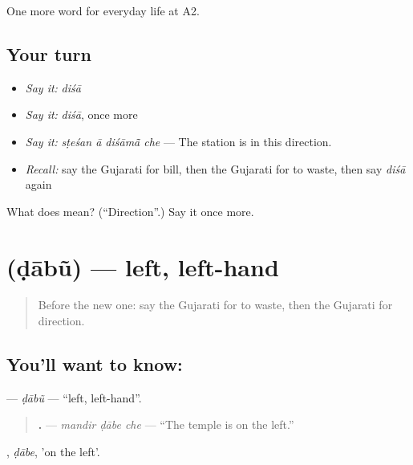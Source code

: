 \begin{grammarlens}[title={What you've built}]
One more word for everyday life at A2.
\end{grammarlens}

\subsection*{Your turn}
\begin{itemize}
\raggedright
  \item \emph{Say it:} \emph{diśā}
  \item \emph{Say it:} \emph{diśā}, once more
  \item \emph{Say it:} \emph{sṭeśan ā diśāmā̃ che} — The station is in this direction.
  \item \emph{Recall:} say the Gujarati for bill, then the Gujarati for to waste, then say \emph{diśā} again
\end{itemize}

\begin{tcolorbox}[breakable,colback=teal!4,colframe=teal!35!black,title={Before you move on}]
What does  mean? (\textquotedblleft{}Direction\textquotedblright{}.) Say it once more.
\end{tcolorbox}
\section[\texorpdfstring{\gu{ડાબું} (ḍābũ)}{ડાબું (ḍābũ)}]{ (ḍābũ) — left, left-hand}

\label{lesson:GU-C193-dabu}



\begin{quote}
Before the new one: say the Gujarati for to waste, then the Gujarati for direction.
\end{quote}

\subsection*{You'll want to know: }
\textbf{} — \emph{ḍābũ} — \textquotedblleft{}left, left-hand\textquotedblright{}.

\begin{quote}
\textbf{  .} — \emph{mandir ḍābe che} — \textquotedblleft{}The temple is on the left.\textquotedblright{}
\end{quote}

\textbf{}, \emph{ḍābe}, 'on the left'.

